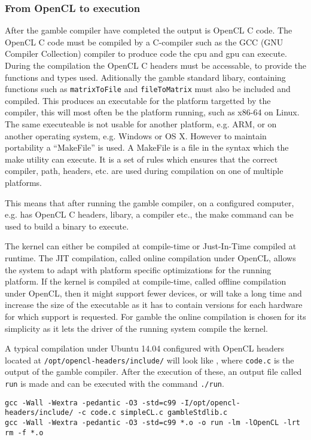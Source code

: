\subsubsection*{From OpenCL to execution}
After the \gls{gamble} compiler have completed the output is OpenCL C code.
The OpenCL C code must be compiled by a C-compiler such as the GCC (GNU Compiler Collection) compiler to produce code the \acrshort{cpu} and \acrshort{gpu} can execute.
During the compilation the OpenCL C headers must be accessable, to provide the functions and types used. 
Aditionally the \gls{gamble} standard libary, containing functions such as \texttt{matrixToFile} and \texttt{fileToMatrix} must also be included and compiled. 
This produces an executable for the platform targetted by the compiler, this will most often be the platform running, such as x86-64 on Linux.
The same executeable is not usable for another platform, e.g. ARM, or on another operating system, e.g. Windows or OS X. 
However to maintain portability a ``MakeFile'' is used. 
A MakeFile is a file in the syntax which the make utility can execute. 
It is a set of rules which ensures that the correct compiler, path, headers, etc. are used during compilation on one of multiple platforms. 

This means that after running the \gls{gamble} compiler, on a configured computer, e.g. has OpenCL C headers, libary, a compiler etc., the make command can be used to build a binary to execute.

The kernel can either be compiled at compile-time or Just-In-Time compiled at runtime.
The JIT compilation, called online compilation under OpenCL, allows the system to adapt with platform specific optimizations for the running platform.
If the kernel is compiled at compile-time, called offline compilation under OpenCL, then it might support fewer devices, or will take a long time and increase the size of the executable as it has to contain versions for each hardware for which support is requested. \citep{openclbookjit}
For \gls{gamble} the online compilation is chosen for its simplicity as it lets the driver of the running system compile the kernel. 

A typical compilation under Ubuntu 14.04 configured with OpenCL headers located at \texttt{/opt/opencl-headers/include/} will look like , where \texttt{code.c} is the output of the \gls{gamble} compiler.
After the execution of these, an output file called \texttt{run} is made and can be executed with the command \texttt{./run}. 

\begin{lstlisting}[caption=The commands executed by the make command according to the rules of the MakeFile,numbers=none,frame=tlrb,label={lst:makecommands}]
gcc -Wall -Wextra -pedantic -O3 -std=c99 -I/opt/opencl-headers/include/ -c code.c simpleCL.c gambleStdlib.c
gcc -Wall -Wextra -pedantic -O3 -std=c99 *.o -o run -lm -lOpenCL -lrt
rm -f *.o
\end{lstlisting}